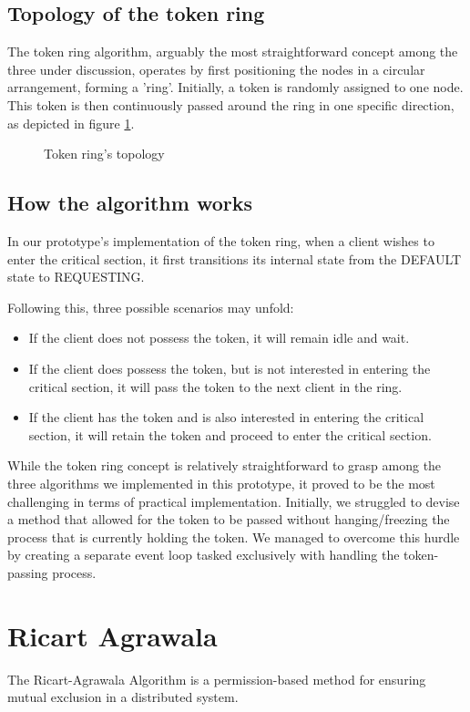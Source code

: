 \subsection{Topology of the token ring}
The token ring algorithm, arguably the most straightforward concept among the three under discussion, operates by first positioning the nodes in a circular arrangement, forming a 'ring'. Initially, a token is randomly assigned to one node. This token is then continuously passed around the ring in one specific direction, as depicted in figure \ref{fig:token_ring_top}.

\begin{figure}[htbp]
  \centering
  
  \caption{Token ring's topology}
  \label{fig:token_ring_top}
\end{figure}

\subsection{How the algorithm works}
In our prototype's implementation of the token ring, when a client wishes to enter the critical section, it first transitions its internal state from the DEFAULT state to REQUESTING. 

Following this, three possible scenarios may unfold:

\begin{itemize}
  \item If the client does not possess the token, it will remain idle and wait.
  \item If the client does possess the token, but is not interested in entering the critical section, it will pass the token to the next client in the ring.
  \item If the client has the token and is also interested in entering the critical section, it will retain the token and proceed to enter the critical section.
\end{itemize}

While the token ring concept is relatively straightforward to grasp among the 
three algorithms we implemented in this prototype, it proved to be the most 
challenging in terms of practical implementation. Initially, we struggled to 
devise a method that allowed for the token to be passed without hanging/freezing the 
process that is currently holding the token. We managed to overcome this hurdle by creating a separate event loop tasked exclusively with handling the token-passing process.

\section{Ricart Agrawala}
The Ricart-Agrawala Algorithm is a permission-based method for ensuring mutual 
exclusion in a distributed system.

